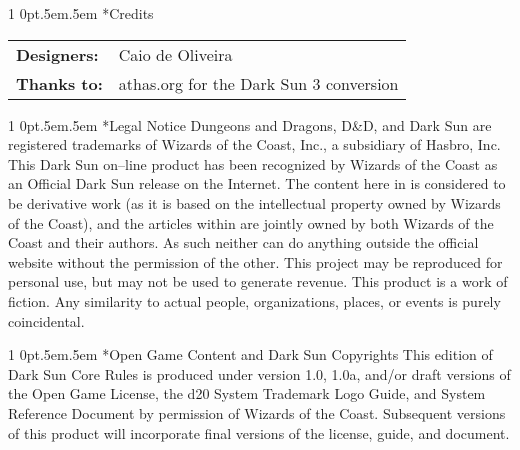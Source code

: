 \documentclass[onecolumn,oneside]{d20}
\makeatletter
\renewcommand\section{
  \@startsection{section}
  {1}
  {0pt}{.5em}{.5em}{\color{ChapterColor}\Large\scshape\raggedleft\imfellEnglish}
}
\makeatother
\begin{document}
\small
\section*{Credits}
\noindent\begin{tabularx}{\textwidth}{>{\bfseries}p{4cm} X}
  Designers: & Caio de Oliveira \\
  Thanks to: & athas.org for the Dark Sun 3 conversion \\
\end{tabularx}

\section*{Legal Notice}
Dungeons and Dragons\textregistered, D\&D, and {Dark Sun\textregistered}  are registered trademarks of Wizards of the Coast, Inc., a subsidiary of Hasbro, Inc. This Dark Sun on--line product has been recognized by Wizards of the Coast as an Official Dark Sun release on the Internet. The content here in is considered to be derivative work (as it is based on the intellectual property owned by Wizards of the Coast), and the articles within are jointly owned by both Wizards of the Coast and their authors. As such neither can do anything outside the official website without the permission of the other. This project may be reproduced for personal use, but may not be used to generate revenue. This product is a work of fiction. Any similarity to actual people, organizations, places, or events is purely coincidental.

\section*{Open Game Content and Dark Sun Copyrights}
This edition of Dark Sun Core Rules is produced under version 1.0, 1.0a, and/or draft versions of the Open Game License, the d20 System Trademark Logo Guide, and System Reference Document by permission of Wizards of the Coast. Subsequent versions of this product will incorporate final versions of the license, guide, and document.
\end{document}
